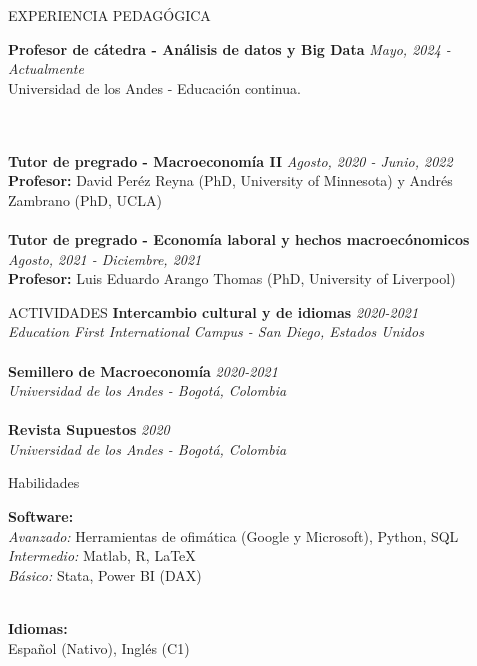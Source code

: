 \documentclass{resume}
\begin{document}
\begin{rSection}{EXPERIENCIA PEDAGÓGICA}

{\bf Profesor de cátedra - Análisis de datos y Big Data} \hfill {\em Mayo, 2024 - Actualmente} 
\\ Universidad de los Andes - Educación continua.

\\
\\
{\bf Tutor de pregrado - Macroeconomía II} \hfill {\em Agosto, 2020 - Junio, 2022} 
\\ \textbf{Profesor:} David Peréz Reyna (PhD, University of Minnesota) y Andrés Zambrano (PhD, UCLA)
\\
\\
{\bf Tutor de pregrado - Economía laboral y hechos macroecónomicos} \hfill {\em Agosto, 2021 - Diciembre, 2021} 
\\ \textbf{Profesor:} Luis Eduardo Arango Thomas (PhD, University of Liverpool)

\end{rSection}

\begin{rSection}{ACTIVIDADES} \itemsep -2pt
{\bf Intercambio cultural y de idiomas} \hfill {\em 2020-2021} 
\\ \textit{Education First International Campus - San Diego, Estados Unidos}
\\
\\
{\bf Semillero de Macroeconomía} \hfill {\em 2020-2021} 
\\ \textit{Universidad de los Andes - Bogotá, Colombia}
\\
\\
{\bf Revista Supuestos} \hfill {\em 2020} 
\\ \textit{Universidad de los Andes - Bogotá, Colombia}

\end{rSection}

\begin{rSection}{Habilidades}

{\bf Software:}\\  \textit{Avanzado:} Herramientas de ofimática (Google y Microsoft), Python, SQL
\\ \textit{Intermedio:} Matlab, R,  \LaTeX
\\ \textit{Básico:} Stata, Power BI (DAX)

\\ {\bf Idiomas:} \\ Español (Nativo), Inglés (C1)


\end{rSection}
\end{document}
